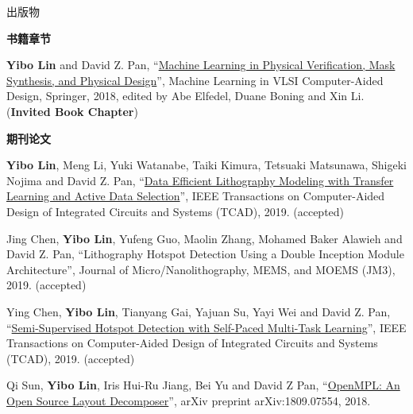 \begin{rSection}{出版物}



\textbf{书籍章节}
        

\begin{description}[font=\normalfont]
    

\item[{[B1]}]{
        \textbf{Yibo Lin} and David Z. Pan, 
    ``\href{http://dx.doi.org/10.1007/978-3-030-04666-8_4}{Machine Learning in Physical Verification, Mask Synthesis, and Physical Design}'', 
    Machine Learning in VLSI Computer-Aided Design, Springer, 2018, edited by Abe Elfedel, Duane Boning and Xin Li.
    (\textbf{Invited Book Chapter})
}
            

\end{description}
    

\textbf{期刊论文}
        

\begin{description}[font=\normalfont]
    

\item[{[J15]}]{
        \textbf{Yibo Lin}, Meng Li, Yuki Watanabe, Taiki Kimura, Tetsuaki Matsunawa, Shigeki Nojima and David Z. Pan, 
    ``\href{https://doi.org/10.1109/TCAD.2018.2864251}{Data Efficient Lithography Modeling with Transfer Learning and Active Data Selection}'', 
    IEEE Transactions on Computer-Aided Design of Integrated Circuits and Systems (TCAD), 2019.
    (accepted)
}
            

\item[{[J14]}]{
        Jing Chen, \textbf{Yibo Lin}, Yufeng Guo, Maolin Zhang, Mohamed Baker Alawieh and David Z. Pan, 
    ``Lithography Hotspot Detection Using a Double Inception Module Architecture'', 
    Journal of Micro/Nanolithography, MEMS, and MOEMS (JM3), 2019.
    (accepted)
}
            

\item[{[J13]}]{
        Ying Chen, \textbf{Yibo Lin}, Tianyang Gai, Yajuan Su, Yayi Wei and David Z. Pan, 
    ``\href{https://doi.org/10.1109/TCAD.2019.2912948}{Semi-Supervised Hotspot Detection with Self-Paced Multi-Task Learning}'', 
    IEEE Transactions on Computer-Aided Design of Integrated Circuits and Systems (TCAD), 2019.
    (accepted)
}
            

\item[{[J12]}]{
        Qi Sun, \textbf{Yibo Lin}, Iris Hui-Ru Jiang, Bei Yu and David Z Pan, 
    ``\href{https://arxiv.org/abs/1809.07554}{OpenMPL: An Open Source Layout Decomposer}'', 
    arXiv preprint arXiv:1809.07554, 2018.
    
}
\end{description}
\end{rSection}
